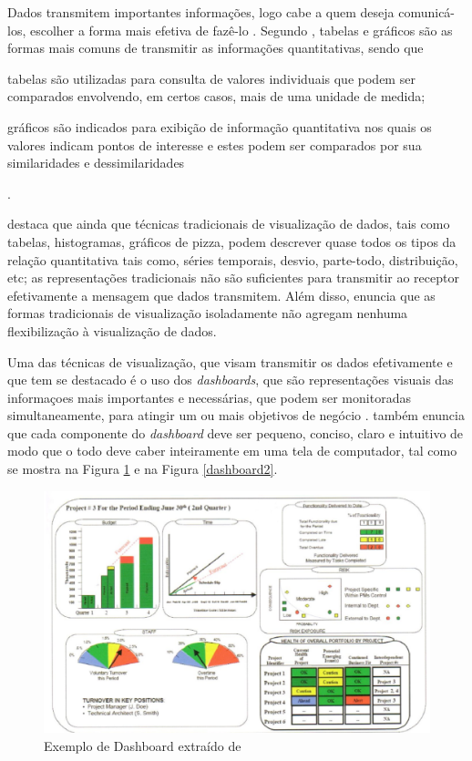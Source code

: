 Dados transmitem importantes informações, logo cabe a quem deseja comunicá-los, escolher a forma mais efetiva de fazê-lo \cite{raquel2013}. Segundo , tabelas e gráficos são as formas mais comuns de transmitir as informações quantitativas, sendo que\begin{inparaenum}[i)]
\item tabelas são utilizadas para consulta de valores individuais que podem ser comparados envolvendo, em certos casos, mais de uma unidade de medida;
\item gráficos são indicados para exibição de informação quantitativa nos quais os valores indicam pontos de interesse e estes podem ser comparados por sua similaridades e dessimilaridades\end{inparaenum}. 


 destaca que ainda que técnicas tradicionais de visualização de dados, tais como tabelas, histogramas, gráficos de pizza, podem descrever quase todos os tipos da relação quantitativa tais como, séries temporais, desvio, parte-todo, distribuição, etc; as representações tradicionais não são suficientes para transmitir ao receptor efetivamente a mensagem que dados transmitem. Além disso,  enuncia que as formas tradicionais de visualização isoladamente não agregam nenhuma flexibilização à visualização de dados.


Uma das técnicas de visualização, que visam transmitir os dados efetivamente e que tem se destacado é o uso dos \textit{dashboards}, que são representações visuais das informaçoes mais importantes e necessárias, que podem ser monitoradas simultaneamente, para atingir um ou mais objetivos de negócio \cite{raquel2013}.  também enuncia que cada componente do \textit{dashboard} deve ser pequeno, conciso, claro e intuitivo de modo que o todo deve caber inteiramente em uma tela de computador, tal como se mostra na Figura \ref{dashboard} e na Figura \ref{dashboard2}.

\begin{figure}[ht!]
\centering
	\includegraphics[keepaspectratio=true,scale=0.8]{figuras/dashboard.eps}
	\caption{Exemplo de Dashboard extraído de 
	}
	\label{dashboard}
\end{figure}
\FloatBarrier


